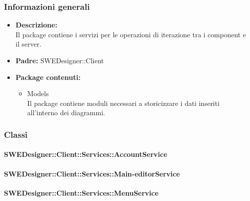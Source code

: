 		\subsubsection{Informazioni generali}
			\begin{itemize}
          		\item \textbf{Descrizione:}\\
          		Il package contiene i servizi per le operazioni di iterazione tra i component e il server.
          		\item \textbf{Padre:} SWEDesigner::Client
          		\item \textbf{Package contenuti:}\\
          		\begin{itemize}
          			\item Models\\
          			Il package contiene moduli necessari a storicizzare i dati inseriti all’interno dei diagrammi.
          		\end{itemize}
          	\end{itemize}
          	
          \subsubsection{Classi}
          
          	\paragraph{SWEDesigner::Client::Services::AccountService}
				
				
			\paragraph{SWEDesigner::Client::Services::Main-editorService}
				
				
			\paragraph{SWEDesigner::Client::Services::MenuService}
				